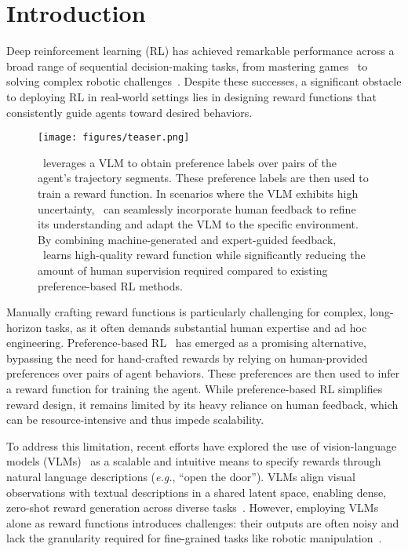 \section{Introduction} \label{sec:intro}

Deep reinforcement learning (RL) has achieved remarkable performance across a broad range of sequential decision-making tasks, from mastering games~\cite{mnih2015human,silver2017mastering,silver2018general} to solving complex robotic challenges~\cite{duan2016benchmarking,levine2016end,kaufmann2023champion}. Despite these successes, a significant obstacle to deploying RL in real-world settings lies in designing reward functions that consistently guide agents toward desired behaviors.
\begin{figure}[t]
    \centering
    \texttt{[image: figures/teaser.png]}
    \caption{\algo~leverages a VLM to obtain preference labels over pairs of the agent's trajectory segments. These preference labels are then used to train a reward function. In scenarios where the VLM exhibits high uncertainty, \algo~can seamlessly incorporate human feedback to refine its understanding and adapt the VLM to the specific environment. By combining machine-generated and expert-guided feedback, \algo~learns high-quality reward function while significantly reducing the amount of human supervision required compared to existing preference-based RL methods.}
    \label{fig:teaser}
\end{figure}
%
Manually crafting reward functions is particularly challenging for complex, long-horizon tasks, as it often demands substantial human expertise and ad hoc engineering. Preference-based RL~\cite{christiano2017deep,lee2021pebble} has emerged as a promising alternative, bypassing the need for hand-crafted rewards by relying on human-provided preferences over pairs of agent behaviors. These preferences are then used to infer a reward function for training the agent. While preference-based RL simplifies reward design, it remains limited by its heavy reliance on human feedback, which can be resource-intensive and thus impede scalability. 

To address this limitation, recent efforts have explored the use of vision-language models (VLMs)~\cite{radford2021learning} as a scalable and intuitive means to specify rewards through natural language descriptions (\textit{e.g.}, ``open the door''). VLMs align visual observations with textual descriptions in a shared latent space, enabling dense, zero-shot reward generation across diverse tasks~\cite{mahmoudieh2022zero,adeniji2023language,ma2023liv,rocamonde2023vision,sontakke2024roboclip}. However, employing VLMs alone as reward functions introduces challenges: their outputs are often noisy and lack the granularity required for fine-grained tasks like robotic manipulation~\cite{fu2024furl}.

